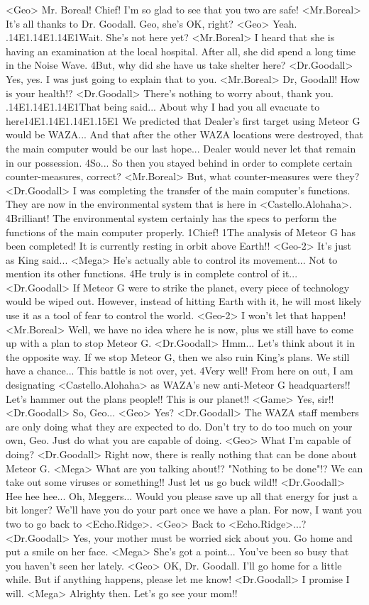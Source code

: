 <Geo> Mr. Boreal! Chief! I'm so glad to see that you two are safe! 
<Mr.Boreal> It's all thanks to Dr. Goodall. 
Geo, she's OK, right? 
<Geo> Yeah. 
.{14}{E1}.{14}{E1}.{14}{E1}Wait. She's not here yet? 
<Mr.Boreal> I heard that she is having an examination at the local hospital. 
After all, she did spend a long time in the Noise Wave. 
4But, why did she have us take shelter here? 
<Dr.Goodall> Yes, yes. 
I was just going to explain that to you. 
<Mr.Boreal> Dr, Goodall! How is your health!? 
<Dr.Goodall> There's nothing to worry about, thank you. 
.{14}{E1}.{14}{E1}.{14}{E1}That being said... About why I had you all evacuate to here{14}{E1}.{14}{E1}.{14}{E1}.{15}{E1} 
We predicted that Dealer's first target using Meteor G would be WAZA... 
And that after the other WAZA locations were destroyed, that the main 
computer would be our last hope... 
Dealer would never let that remain in our possession. 
4So... 
So then you stayed behind in order to complete certain counter-measures, correct? 
<Mr.Boreal> But, what counter-measures were they? 
<Dr.Goodall> I was completing the transfer of the main computer's functions. 
They are now in the environmental system that is here in <Castello.Alohaha>. 
4Brilliant! 
The environmental system certainly has the specs to 
perform the functions of the main computer properly. 
1Chief! 
1The analysis of Meteor G has been completed! 
It is currently resting in orbit above Earth!! 
<Geo-2> It's just as King said... 
<Mega> He's actually able to control its movement... Not to mention its other functions. 
4He truly is in complete control of it... 
<Dr.Goodall> If Meteor G were to strike the planet, every piece of 
technology would be wiped out. 
However, instead of hitting Earth with it, he will most 
likely use it as a tool of fear to control the world. 
<Geo-2> I won't let that happen! 
<Mr.Boreal> Well, we have no idea where he is now, plus we still have 
to come up with a plan to stop Meteor G. 
<Dr.Goodall> Hmm... 
Let's think about it in the opposite way. If we stop 
Meteor G, then we also ruin King's plans. 
We still have a chance... This battle is not over, yet. 
4Very well! 
From here on out, I am designating <Castello.Alohaha> 
as WAZA's new anti-Meteor G headquarters!! 
Let's hammer out the plans people!! This is our planet!! 
<Game> Yes, sir!! 
<Dr.Goodall> So, Geo... 
<Geo> Yes? 
<Dr.Goodall> The WAZA staff members are only doing what they are expected to do. 
Don't try to do too much on your own, Geo. Just do what you are capable of doing. 
<Geo> What I'm capable of doing? 
<Dr.Goodall> Right now, there is really nothing that can be done about Meteor G. 
<Mega> What are you talking about!? "Nothing to be done"!? 
We can take out some viruses or something!! Just let us go buck wild!! 
<Dr.Goodall> Hee hee hee... Oh, Meggers... 
Would you please save up all that energy for just a bit longer? 
We'll have you do your part once we have a plan. 
For now, I want you two to go back to <Echo.Ridge>. 
<Geo> Back to <Echo.Ridge>...? 
<Dr.Goodall> Yes, your mother must be worried sick about you. 
Go home and put a smile on her face. 
<Mega> She's got a point... You've been so busy that you haven't seen her lately. 
<Geo> OK, Dr. Goodall. I'll go home for a little while. 
But if anything happens, please let me know! 
<Dr.Goodall> I promise I will. 
<Mega> Alrighty then. Let's go see your mom!! 
